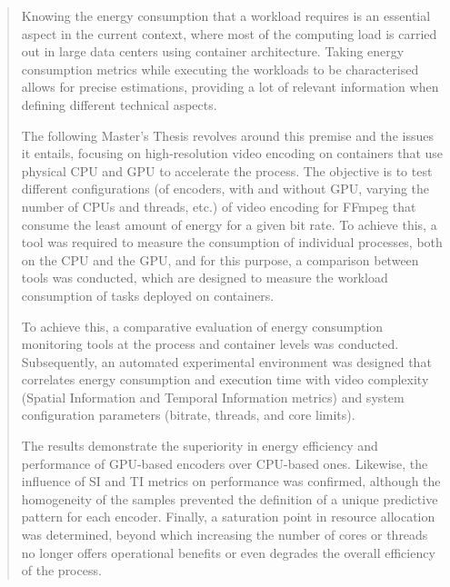 \documentclass[twoside,english,a4paper,12pt]{plantilla/twcam-tfm-doc}
\begin{document}
\begin{abstract}
 Knowing the energy consumption that a workload requires is an essential aspect in the current context, where most of the computing load is carried out in large data centers using container architecture. Taking energy consumption metrics while executing the workloads to be characterised allows for precise estimations, providing a lot of relevant information when defining different technical aspects.
 
 The following Master's Thesis revolves around this premise and the issues it entails, focusing on high-resolution video encoding on containers that use physical CPU and GPU to accelerate the process. The objective is to test different configurations (of encoders, with and without GPU, varying the number of CPUs and threads, etc.) of video encoding for FFmpeg that consume the least amount of energy for a given bit rate. To achieve this, a tool was required to measure the consumption of individual processes, both on the CPU and the GPU, and for this purpose, a comparison between tools was conducted, which are designed to measure the workload consumption of tasks deployed on containers.
 
 To achieve this, a comparative evaluation of energy consumption monitoring tools at the process and container levels was conducted. Subsequently, an automated experimental environment was designed that correlates energy consumption and execution time with video complexity (Spatial Information and Temporal Information metrics) and system configuration parameters (bitrate, threads, and core limits).
 
 The results demonstrate the superiority in energy efficiency and performance of GPU-based encoders over CPU-based ones. Likewise, the influence of SI and TI metrics on performance was confirmed, although the homogeneity of the samples prevented the definition of a unique predictive pattern for each encoder. Finally, a saturation point in resource allocation was determined, beyond which increasing the number of cores or threads no longer offers operational benefits or even degrades the overall efficiency of the process.
\end{abstract}
\clearpage
\end{document}
